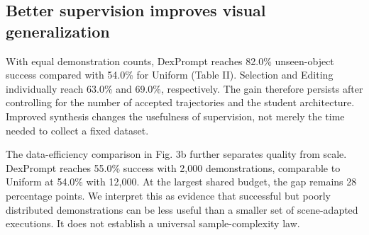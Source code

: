 \documentclass[letterpaper,10pt,conference]{ieeeconf}
\begin{document}
\subsection{Better supervision improves visual generalization}
\begin{table}[t]
\centering
\caption{HYPOTHETICAL RESULTS. Unseen-object visual BC, two distractors, provided initial mask with tracking. Means and sample standard deviations are calculated from five synthetic seed scores; they are not empirical uncertainty estimates.}
\label{tab:2}
\end{table}
With equal demonstration counts, DexPrompt reaches 82.0\% unseen-object success compared with 54.0\% for Uniform (Table II). Selection and Editing individually reach 63.0\% and 69.0\%, respectively. The gain therefore persists after controlling for the number of accepted trajectories and the student architecture. Improved synthesis changes the usefulness of supervision, not merely the time needed to collect a fixed dataset.

The data-efficiency comparison in Fig. 3b further separates quality from scale. DexPrompt reaches 55.0\% success with 2,000 demonstrations, comparable to Uniform at 54.0\% with 12,000. At the largest shared budget, the gap remains 28 percentage points. We interpret this as evidence that successful but poorly distributed demonstrations can be less useful than a smaller set of scene-adapted executions. It does not establish a universal sample-complexity law.
\end{document}

